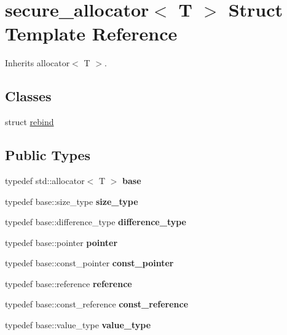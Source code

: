 \hypertarget{structsecure__allocator}{}\section{secure\+\_\+allocator$<$ T $>$ Struct Template Reference}
\label{structsecure__allocator}


Inherits allocator$<$ T $>$.

\subsection*{Classes}
\begin{DoxyCompactItemize}
\item 
struct \mbox{\hyperlink{structsecure__allocator_1_1rebind}{rebind}}
\end{DoxyCompactItemize}
\subsection*{Public Types}
\begin{DoxyCompactItemize}
\item 
\mbox{\label{structsecure__allocator_aecbe486abe3e32e35e3289e149bd2356}} 
typedef std\+::allocator$<$ T $>$ {\bfseries base}
\item 
\mbox{\label{structsecure__allocator_aa9db67804b069d61983213bded98c08f}} 
typedef base\+::size\+\_\+type {\bfseries size\+\_\+type}
\item 
\mbox{\label{structsecure__allocator_a6ced0c166194ce9a266df10018cbb862}} 
typedef base\+::difference\+\_\+type {\bfseries difference\+\_\+type}
\item 
\mbox{\label{structsecure__allocator_a71b267e8d1667eacf8c3505cce785aea}} 
typedef base\+::pointer {\bfseries pointer}
\item 
\mbox{\label{structsecure__allocator_abf76dd1c45de47c15d7a8c53cb2d8ab9}} 
typedef base\+::const\+\_\+pointer {\bfseries const\+\_\+pointer}
\item 
\mbox{\label{structsecure__allocator_a6d85bb5fed183fb2304b8403a8843eb4}} 
typedef base\+::reference {\bfseries reference}
\item 
\mbox{\label{structsecure__allocator_a5ec58945b7a8010f7e8a77ebfd96ae8e}} 
typedef base\+::const\+\_\+reference {\bfseries const\+\_\+reference}
\item 
\mbox{\label{structsecure__allocator_a344198c1316ccf0a1b58ce9c0de7c012}} 
typedef base\+::value\+\_\+type {\bfseries value\+\_\+type}
\end{DoxyCompactItemize}
